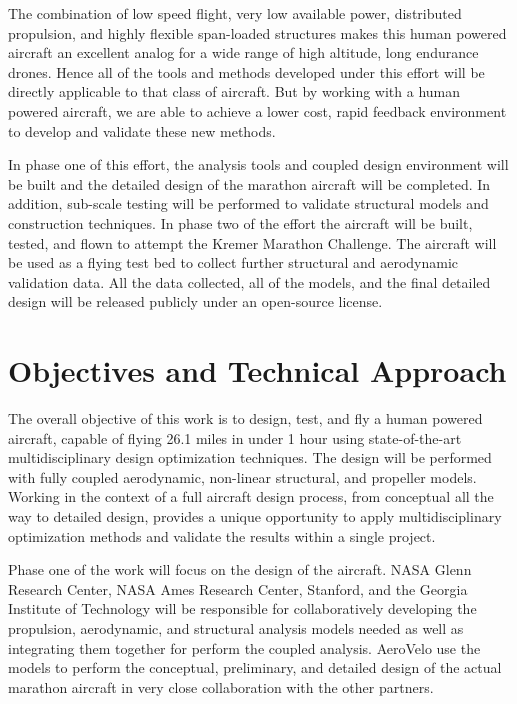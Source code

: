\documentclass[]{aiaa-tc}
\begin{document}
    The combination of low speed flight, very low available power, distributed propulsion, and highly 
    flexible span-loaded structures makes this human powered aircraft an excellent analog for a wide 
    range of high altitude, long endurance drones. Hence all of the tools and methods developed under 
    this effort will be directly applicable to that class of aircraft. But by working with a human powered 
    aircraft, we are able to achieve a lower cost, rapid feedback environment to develop and validate these 
    new methods. 

    In phase one of this effort, the analysis tools and coupled design environment will be built and 
    the detailed design of the marathon aircraft will be completed. In addition, sub-scale testing will be 
    performed to validate structural models and construction techniques. In phase two of the effort
    the aircraft will be built, tested, and flown to attempt the Kremer Marathon Challenge. The aircraft will be 
    used as a flying test bed to collect further structural and aerodynamic validation data. All the data collected, 
    all of the models, and the final detailed design will be released publicly under an open-source license.

  \section{Objectives and Technical Approach}

    The overall objective of this work is to design, test, and fly a human powered aircraft, 
    capable of flying 26.1 miles in under 1 hour using state-of-the-art multidisciplinary 
    design optimization techniques. The design will be performed with fully coupled
    aerodynamic, non-linear structural, and propeller models. Working in the context of 
    a full aircraft design process, from conceptual all the way to detailed design, 
    provides a unique opportunity to apply multidisciplinary optimization methods and validate
    the results within a single project. 

    Phase one of the work will focus on the design of the aircraft. NASA Glenn Research Center, 
    NASA Ames Research Center, Stanford, and the Georgia Institute of Technology will be responsible 
    for collaboratively developing the propulsion, aerodynamic, and structural analysis 
    models needed as well as integrating them together for perform the coupled analysis. AeroVelo 
    use the models to perform the conceptual, preliminary, and detailed design of the actual marathon 
    aircraft in very close collaboration with the other partners. 
\end{document}
